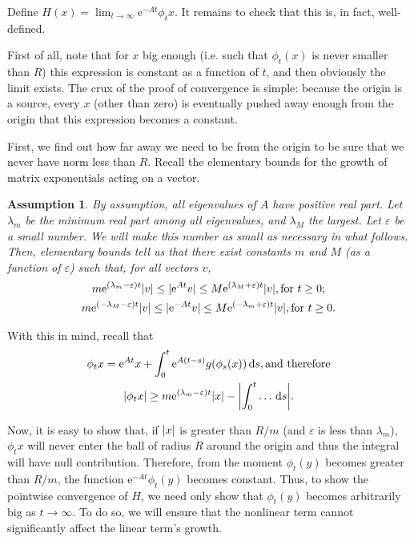 \documentclass{article}
\newcommand{\e}{\mathrm{e}}
\DeclarePairedDelimiter{\abs}{\lvert}{\rvert}
\newtheorem*{Assumption}{Assumption}
\begin{document}
Define $H(x) = \lim_{t \to \infty} \e^{-A t} \phi_t x$. It remains to check that this is, in fact, well-defined.

First of all, note that for $x$ big enough (i.e. such that $\phi_t(x)$ is never smaller than $R$) this expression is constant as a function of $t$, and then obviously the limit exists. The crux of the proof of convergence is simple: because the origin is a source, every $x$ (other than zero) is eventually pushed away enough from the origin that this expression becomes a constant.

First, we find out how far away we need to be from the origin to be sure that we never have norm less than $R$. Recall the elementary bounds for the growth of matrix exponentials acting on a vector.

\begin{Assumption}
By assumption, all eigenvalues of $A$ have positive real part. Let $\lambda_m$ be the minimum real part among all eigenvalues, and $\lambda_M$ the largest. Let $\varepsilon$ be a small number. We will make this number as small as necessary in what follows. Then, elementary bounds tell us that there exist constants $m$ and $M$ (as a function of $\varepsilon$) such that, for all vectors $v$,
\begin{gather*}
m \e^{(\lambda_m - \varepsilon)t} \abs{v} \leq \abs{\e^{A t} v} \leq M \e^{(\lambda_M + \varepsilon)t} \abs{v}, \text{for $t \geq 0$};\\
m \e^{(-\lambda_M - \varepsilon) t} \abs{v} \leq \abs{\e^{-A t} v} \leq M \e^{(-\lambda_m + \varepsilon) t} \abs{v}, \text{for $t \geq 0$}.
\end{gather*}
\end{Assumption}

With this in mind, recall that
\begin{gather*}
\phi_t x = \e^{A t} x + \int_0^t \e^{A (t-s)} g(\phi_s(x)) \dl s, \text{and therefore}\\
\abs{\phi_t x} \geq m \e^{(\lambda_m - \varepsilon) t} \abs{x} - \abs*{\int_0^t \dots \dl s}.
\end{gather*}

Now, it is easy to show that, if $\abs{x}$ is greater than $R/m$ (and $\varepsilon$ is less than $\lambda_m$), $\phi_t x$ will never enter the ball of radius $R$ around the origin and thus the integral will have null contribution. Therefore, from the moment $\phi_t(y)$ becomes greater than $R/m$, the function $\e^{-A t} \phi_t(y)$ becomes constant. Thus, to show the pointwise convergence of $H$, we need only show that $\phi_t(y)$ becomes arbitrarily big as $t \to \infty$. To do so, we will ensure that the nonlinear term cannot significantly affect the linear term's growth.
\end{document}
